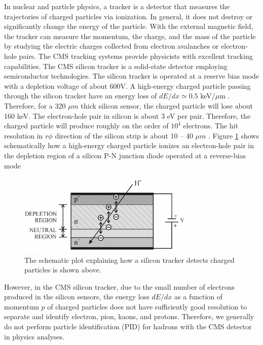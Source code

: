 In nuclear and particle physics, a tracker is a detector that measures the trajectories of charged particles via ionization. In general, it does not destroy or significantly change the energy of the particle. With the external magnetic field, the tracker can measure the momentum, the charge, and the mass of the particle by studying the electric charges collected from electron avalanches or electron-hole pairs. The CMS tracking systems provide physicists with excellent tracking capabilities. The CMS silicon tracker is a solid-state detector employing semiconductor technologies. The silicon tracker is operated at a reserve bias mode with a depletion voltage of about 600V. A high-energy charged particle passing through the silicon tracker have an energy loss of $dE/dx \simeq 0.5$ keV/$\mu$m \cite{AlphaTheoEx}. Therefore, for a 320 $\mu m$ thick silicon sensor, the charged particle will lose about 160 keV. The electron-hole pair in silicon is about 3 eV per pair. Therefore, the charged particle will produce roughly on the order of $10^4$ electrons. The hit resolution in $r\phi$ direction of the silicon strip is about 10 -- 40 $\mu m$ \cite{CMSTrackComp}. Figure \ref{SiliconDetector} shows schematically how a high-energy charged particle ionizes an electron-hole pair in the depletion region of a silicon P-N junction diode operated at a reverse-bias mode


\begin{figure}[hbtp]
\begin{center}
\includegraphics[width=0.75\textwidth]{Figures/Chapter3/SiliconDetector.png}
\caption{The schematic plot explaining how a silicon tracker detects charged particles is shown above.}
\label{SiliconDetector}
\end{center}
\end{figure} 

However, in the CMS silicon tracker, due to the small number of electrons produced in the silicon sensors, the energy loss $dE/dx$ as a function of momentum $p$ of charged particles does not have sufficiently good resolution to separate and identify electron, pion, kaons, and protons. Therefore, we generally do not perform particle identification (PID) for hadrons with the CMS detector in physics analyses.  

